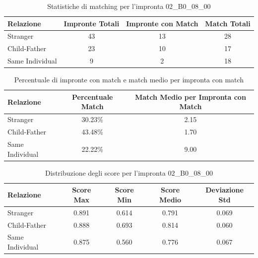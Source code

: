 \begin{table}[htbp]
\centering
\caption{Statistiche di matching per l'impronta 02\_B0\_08\_00}
\label{tab:results_02_B0_08_00}
\begin{tabular}{|l|c|c|c|}
\hline
\textbf{Relazione} & \textbf{Impronte Totali} & \textbf{Impronte con Match} & \textbf{Match Totali} \\
\hline
Stranger & 43 & 13 & 28 \\
\hline
Child-Father & 23 & 10 & 17 \\
\hline
Same Individual & 9 & 2 & 18 \\
\hline
\end{tabular}
\end{table}


\begin{table}[htbp]
\centering
\caption{Percentuale di impronte con match e match medio per impronta con match}
\label{tab:match_percentage_02_B0_08_00}
\begin{tabular}{|l|c|c|}
\hline
\textbf{Relazione} & \textbf{Percentuale Match} & \textbf{Match Medio per Impronta con Match} \\
\hline
Stranger & 30.23\% & 2.15 \\
\hline
Child-Father & 43.48\% & 1.70 \\
\hline
Same Individual & 22.22\% & 9.00 \\
\hline
\end{tabular}
\end{table}


\begin{table}[htbp]
\centering
\caption{Distribuzione degli score per l'impronta 02\_B0\_08\_00}
\label{tab:scores_02_B0_08_00}
\begin{tabular}{|l|c|c|c|c|}
\hline
\textbf{Relazione} & \textbf{Score Max} & \textbf{Score Min} & \textbf{Score Medio} & \textbf{Deviazione Std} \\
\hline
Stranger & 0.891 & 0.614 & 0.791 & 0.069 \\
\hline
Child-Father & 0.888 & 0.693 & 0.814 & 0.060 \\
\hline
Same Individual & 0.875 & 0.560 & 0.776 & 0.067 \\
\hline
\end{tabular}
\end{table}

